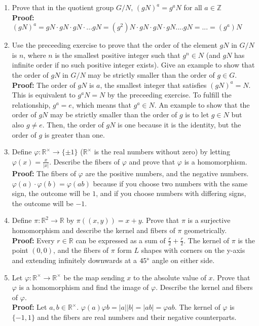 \documentclass{article}
\begin{document}
\begin{enumerate}
    \item Prove that in the quotient group $G/N$, $(gN)^a = g^aN$ for all $a \in \mathbb{Z}$ \\ \textbf{Proof:} $(gN)^a = gN \cdot gN \cdot gN \cdot ... gN = (g^2)N \cdot gN \cdot gN \cdot gN .... gN = ... = (g^a)N$
    \item Use the preceeding exercise to prove that the order of the element $gN$ in $G/N$ is $n$, where $n$ is the smallest positive integer such that $g^n \in N$ (and $gN$ has infinite order if no such positive integer exists). Give an example to show that the order of $gN$ in $G/N$ may be strictly smaller than the order of $g \in G$. \\ \textbf{Proof:} The order of $gN$ is $a$, the smallest integer that satisfies $(gN)^a = N$. This is equivalent to $g^aN = N$ by the preceeding exercise. To fulfill the relationship, $g^a = e$, which means that $g^a \in N$. An example to show that the order of $gN$ may be strictly smaller than the order of $g$ is to let $g\in N$ but also $g \neq e$. Then, the order of $gN$ is one because it is the identity, but the order of $g$ is greater than one.
    \item Define $\varphi : \mathbb{R}^\times \rightarrow \{\pm 1\}$ ($\mathbb{R}^\times$ is the real numbers without zero) by letting $\varphi (x) = \frac{x}{\vert x \vert}$. Describe the fibers of $\varphi$ and prove that $\varphi$ is a homomorphism. \\ \textbf{Proof:} The fibers of $\varphi$ are the positive numbers, and the negative numbers. $\varphi (a) \cdot \varphi (b) = \varphi (ab)$ because if you choose two numbers with the same sign, the outcome will be $1$, and if you choose numbers with differing signs, the outcome will be $-1$.
    \item Define $\pi: \mathbb{R}^2 \rightarrow \mathbb{R}$ by $\pi((x,y)) = x+y$. Prove that $\pi$ is a surjective homomorphism and describe the kernel and fibers of $\pi$ geometrically. \\ \textbf{Proof:} Every $r \in \mathbb{R}$ can be expressed as a sum of $\frac{r}{2} + \frac{r}{2}$. The kernel of $\pi$ is the point $(0,0)$, and the fibers of $\pi$ form $L$ shapes with corners on the y-axis and extending infinitely downwards at a $45 \degree$ angle on either side.       
    \item Let $\varphi : \mathbb{R}^\times \rightarrow \mathbb{R}^\times$ be the map sending $x$ to the absolute value of $x$. Prove that $\varphi$ is a homomorphism and find the image of $\varphi$. Describe the kernel and fibers of $\varphi$. \\ \textbf{Proof:} Let $a,b \in \mathbb{R}^\times$. $\varphi (a) \varphi{b} = \vert a\vert \vert b\vert = \vert ab \vert = \varphi {ab}$. The kernel of $\varphi$ is $\{-1, 1\}$ and the fibers are real numbers and their negative counterparts.

\end{enumerate}
\end{document}
